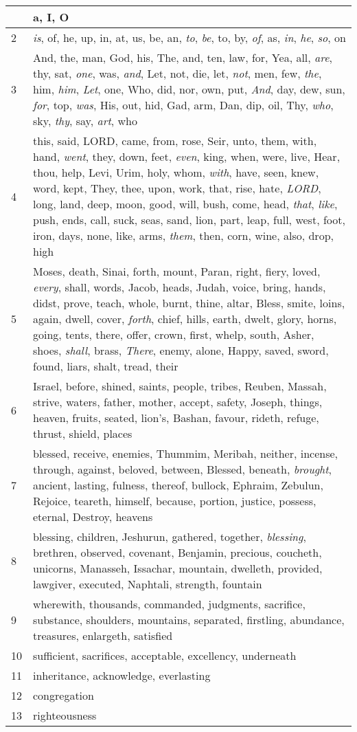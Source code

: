 \begin{longtable}{l|p{3.75in}}
\hline \hline
\endlastfoot
1 & a, I, O \\ \hline
2 & \emph{is}, of, he, up, in, at, us, be, an, \emph{to}, \emph{be}, to, by, \emph{of}, as, \emph{in}, \emph{he}, \emph{so}, on \\ \hline
3 & And, the, man, God, his, The, and, ten, law, for, Yea, all, \emph{are}, thy, sat, \emph{one}, was, \emph{and}, Let, not, die, let, \emph{not}, men, few, \emph{the}, him, \emph{him}, \emph{Let}, one, Who, did, nor, own, put, \emph{And}, day, dew, sun, \emph{for}, top, \emph{was}, His, out, hid, Gad, arm, Dan, dip, oil, Thy, \emph{who}, sky, \emph{thy}, say, \emph{art}, who \\ \hline
4 & this, said, LORD, came, from, rose, Seir, unto, them, with, hand, \emph{went}, they, down, feet, \emph{even}, king, when, were, live, Hear, thou, help, Levi, Urim, holy, whom, \emph{with}, have, seen, knew, word, kept, They, thee, upon, work, that, rise, hate, \emph{LORD}, long, land, deep, moon, good, will, bush, come, head, \emph{that}, \emph{like}, push, ends, call, suck, seas, sand, lion, part, leap, full, west, foot, iron, days, none, like, arms, \emph{them}, then, corn, wine, also, drop, high \\ \hline
5 & Moses, death, Sinai, forth, mount, Paran, right, fiery, loved, \emph{every}, shall, words, Jacob, heads, Judah, voice, bring, hands, didst, prove, teach, whole, burnt, thine, altar, Bless, smite, loins, again, dwell, cover, \emph{forth}, chief, hills, earth, dwelt, glory, horns, going, tents, there, offer, crown, first, whelp, south, Asher, shoes, \emph{shall}, brass, \emph{There}, enemy, alone, Happy, saved, sword, found, liars, shalt, tread, their \\ \hline
6 & Israel, before, shined, saints, people, tribes, Reuben, Massah, strive, waters, father, mother, accept, safety, Joseph, things, heaven, fruits, seated, lion's, Bashan, favour, rideth, refuge, thrust, shield, places \\ \hline
7 & blessed, receive, enemies, Thummim, Meribah, neither, incense, through, against, beloved, between, Blessed, beneath, \emph{brought}, ancient, lasting, fulness, thereof, bullock, Ephraim, Zebulun, Rejoice, teareth, himself, because, portion, justice, possess, eternal, Destroy, heavens \\ \hline
8 & blessing, children, Jeshurun, gathered, together, \emph{blessing}, brethren, observed, covenant, Benjamin, precious, coucheth, unicorns, Manasseh, Issachar, mountain, dwelleth, provided, lawgiver, executed, Naphtali, strength, fountain \\ \hline
9 & wherewith, thousands, commanded, judgments, sacrifice, substance, shoulders, mountains, separated, firstling, abundance, treasures, enlargeth, satisfied \\ \hline
10 & sufficient, sacrifices, acceptable, excellency, underneath \\ \hline
11 & inheritance, acknowledge, everlasting \\ \hline
12 & congregation \\ \hline
13 & righteousness \\ \hline
\end{longtable}
